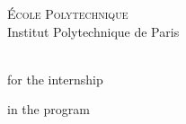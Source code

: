 \begin{titlepage}
  \onehalfspacing
  \makeatletter
  \vspace*{1em}
  \begin{center}
    {\LARGE\textsc{École Polytechnique}}\\[0.2em]
    {\Large Institut Polytechnique de Paris}

    \par\vspace{3em}
    {%
      \@subject\\
      for the \@course \space internship\par
      in the \@degree \space program
    }\\

    {
	  \dates
    }\\

    \vfill
    {\@title}
    
    \par\vspace{2em}
    {\@author}
  \end{center}
  \makeatother


\end{titlepage}
